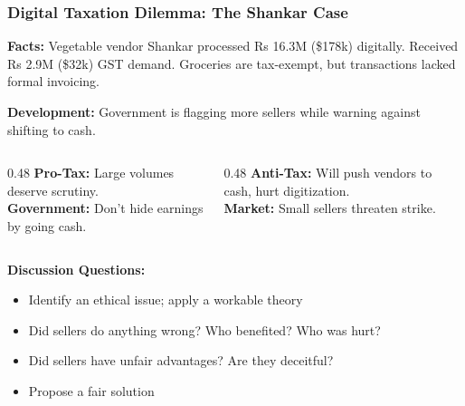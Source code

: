 \documentclass[10pt]{beamer}
\begin{document}
\begin{frame}
\frametitle{Digital Taxation Dilemma: The Shankar Case}

\textbf{Facts:} Vegetable vendor Shankar processed Rs 16.3M (\$178k) digitally.
Received Rs 2.9M (\$32k) GST demand. Groceries are tax-exempt, but transactions lacked formal invoicing.

\vspace{0.2cm}
\textbf{Development:} Government is flagging more sellers while warning against shifting to cash.

\vspace{0.3cm}

\begin{columns}[T]
\begin{column}{0.48\textwidth}
\textbf{Pro-Tax:} Large volumes deserve scrutiny.\\[0.15cm]
\textbf{Government:} Don't hide earnings by going cash.
\end{column}
\begin{column}{0.48\textwidth}
\textbf{Anti-Tax:} Will push vendors to cash, hurt digitization.\\[0.15cm]
\textbf{Market:} Small sellers threaten strike.
\end{column}
\end{columns}

\vspace{0.3cm}

\textbf{Discussion Questions:}
\begin{itemize}\itemsep0em
\item Identify an ethical issue; apply a workable theory
\item Did sellers do anything wrong? Who benefited? Who was hurt?
\item Did sellers have unfair advantages? Are they deceitful?
\item Propose a fair solution
\end{itemize}

\end{frame}
\end{document}
